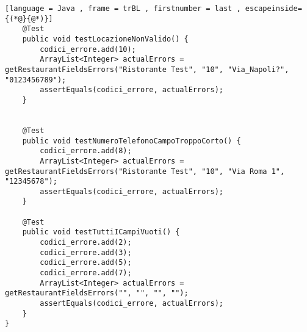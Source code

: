 \begin{lstlisting}[language = Java , frame = trBL , firstnumber = last , escapeinside={(*@}{@*)}]
    @Test
    public void testLocazioneNonValido() {
        codici_errore.add(10);
        ArrayList<Integer> actualErrors = getRestaurantFieldsErrors("Ristorante Test", "10", "Via_Napoli?", "0123456789");
        assertEquals(codici_errore, actualErrors);
    }


    @Test
    public void testNumeroTelefonoCampoTroppoCorto() {
        codici_errore.add(8);
        ArrayList<Integer> actualErrors = getRestaurantFieldsErrors("Ristorante Test", "10", "Via Roma 1", "12345678");
        assertEquals(codici_errore, actualErrors);
    }

    @Test
    public void testTuttiICampiVuoti() {
        codici_errore.add(2);
        codici_errore.add(3);
        codici_errore.add(5);
        codici_errore.add(7);
        ArrayList<Integer> actualErrors = getRestaurantFieldsErrors("", "", "", "");
        assertEquals(codici_errore, actualErrors);
    }
}
\end{lstlisting}

